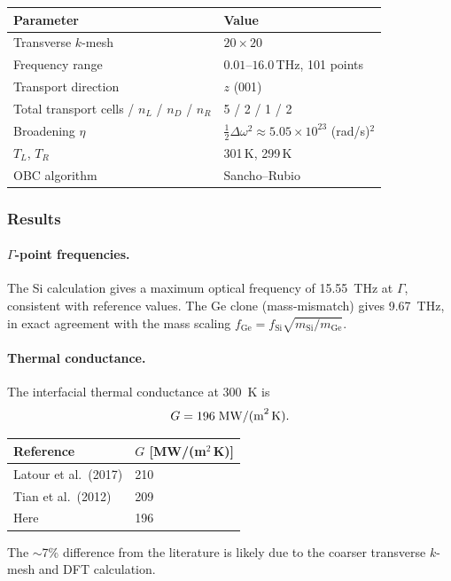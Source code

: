 \begin{center}
\begin{tabular}{ll}
  \toprule
  Parameter & Value \\
  \midrule
  Transverse $k$-mesh & $20\times20$ \\
  Frequency range & $0.01$--$16.0$\,THz, 101 points \\
  Transport direction & $z$ (001) \\
  Total transport cells / $n_L$ / $n_D$ / $n_R$ & 5 / 2 / 1 / 2 \\
  Broadening $\eta$ & $\tfrac{1}{2}\Delta\omega^2 \approx 5.05\times10^{23}$ (rad/s)$^2$ \\
  $T_L$, $T_R$ & 301\,K, 299\,K \\
  OBC algorithm & Sancho--Rubio \\
  \bottomrule
\end{tabular}
\end{center}

\subsubsection{Results}

\paragraph{$\Gamma$-point frequencies.}
The Si calculation gives a maximum optical frequency of 15.55~THz at
$\Gamma$, consistent with reference values.  The
Ge clone (mass-mismatch) gives 9.67~THz, in exact agreement with the
mass scaling $f_\text{Ge} = f_\text{Si}\sqrt{m_\text{Si}/m_\text{Ge}}$.

\paragraph{Thermal conductance.}
The interfacial thermal conductance at 300~K is
\begin{equation}
  G = 196\;\text{MW/(m}^2\text{\,K)}.
\end{equation}

\begin{center}
\begin{tabular}{ll}
  \toprule
  Reference &  $G$ [MW/(m$^2$\,K)] \\
  \midrule
  Latour et al.\ (2017) \cite{latour_ab_2017} & 210 \\
  Tian et al.\ (2012) \cite{tian_enhancing_2012}     &209 \\
  Here                                &  196 \\
  \bottomrule
\end{tabular}
\end{center}
The $\sim$7\% difference from the  literature is
likely due to the coarser transverse $k$-mesh and DFT calculation.

